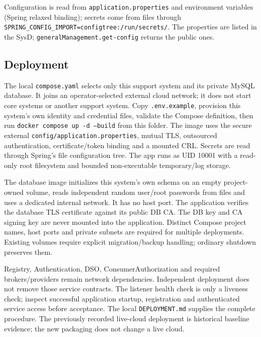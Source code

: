 \documentclass[a4paper]{arrowhead}
\begin{document}
Configuration is read from \texttt{application.\allowbreak{}properties} and environment variables (Spring relaxed binding); secrets come from files through \texttt{SPRING\_\allowbreak{}CONFIG\_\allowbreak{}IMPORT=\allowbreak{}configtree:\allowbreak{}/\allowbreak{}run/\allowbreak{}secrets/\allowbreak{}}. The properties are listed in the SysD; \texttt{general\allowbreak{}Management.\allowbreak{}get-\allowbreak{}config} returns the public ones.

\subsection{Deployment}

The local \texttt{compose.yaml} selects only this support system and its private MySQL database. It joins an operator-selected external cloud network; it does not start core systems or another support system. Copy \texttt{.env.example}, provision this system's own identity and credential files, validate the Compose definition, then run \texttt{docker compose up -d --build} from this folder. The image uses the secure external \texttt{config/application.properties}, mutual TLS, outsourced authentication, certificate/token binding and a mounted CRL. Secrets are read through Spring's file configuration tree. The app runs as UID 10001 with a read-only root filesystem and bounded non-executable temporary/log storage.

The database image initializes this system's own schema on an empty project-owned volume, reads independent random user/root passwords from files and uses a dedicated internal network. It has no host port. The application verifies the database TLS certificate against its public DB CA. The DB key and CA signing key are never mounted into the application. Distinct Compose project names, host ports and private subnets are required for multiple deployments. Existing volumes require explicit migration/backup handling; ordinary shutdown preserves them.

Registry, Authentication, DSO, ConsumerAuthorization and required brokers/providers remain network dependencies. Independent deployment does not remove those service contracts. The listener health check is only a liveness check; inspect successful application startup, registration and authenticated service access before acceptance. The local \texttt{DEPLOYMENT.md} supplies the complete procedure. The previously recorded live-cloud deployment is historical baseline evidence; the new packaging does not change a live cloud.
\end{document}
